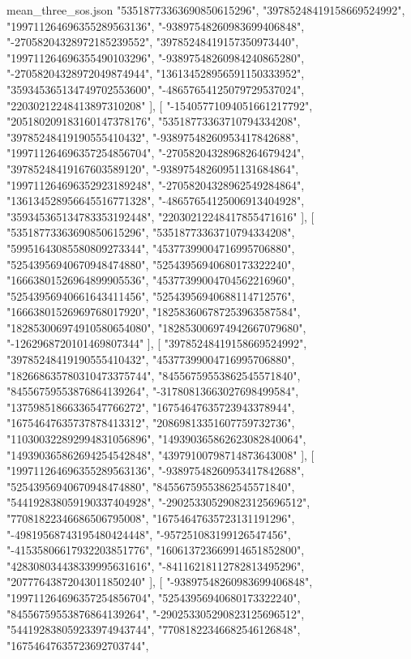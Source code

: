 \begin{filecontents*}[overwrite]{mean_three_sos.json}
    "53518773363690850615296",
    "39785248419158669524992",
    "199711264696355289563136",
    "-93897548260983699406848",
    "-27058204328972185239552",
    "39785248419157350973440",
    "199711264696355490103296",
    "-93897548260984240865280",
    "-27058204328972049874944",
    "136134528956591150333952",
    "359345365134749702553600",
    "-48657654125079729537024",
    "22030212248413897310208"
   ],
   [
    "-15405771094051661217792",
    "205180209183160147378176",
    "53518773363710794334208",
    "39785248419190555410432",
    "-93897548260953417842688",
    "199711264696357254856704",
    "-27058204328968264679424",
    "39785248419167603589120",
    "-93897548260951131684864",
    "199711264696352923189248",
    "-27058204328962549284864",
    "136134528956645516771328",
    "-48657654125006913404928",
    "359345365134783353192448",
    "22030212248417855471616"
   ],
   [
    "53518773363690850615296",
    "53518773363710794334208",
    "59951643085580809273344",
    "45377399004716995706880",
    "52543956940670948474880",
    "52543956940680173322240",
    "16663801526964899905536",
    "45377399004704562216960",
    "52543956940661643411456",
    "52543956940688114712576",
    "16663801526969768017920",
    "182583606787253963587584",
    "182853006974910580654080",
    "182853006974942667079680",
    "-1262968720101469807344"
   ],
   [
    "39785248419158669524992",
    "39785248419190555410432",
    "45377399004716995706880",
    "182668635780310473375744",
    "84556759553862545571840",
    "84556759553876864139264",
    "-31780813663027698499584",
    "13759851866336547766272",
    "16754647635723943378944",
    "16754647635737878413312",
    "20869813351607759732736",
    "110300322892994831056896",
    "149390365862623082840064",
    "149390365862694254542848",
    "43979100798714873643008"
   ],
   [
    "199711264696355289563136",
    "-93897548260953417842688",
    "52543956940670948474880",
    "84556759553862545571840",
    "544192838059190337404928",
    "-290253305290823125696512",
    "77081822346686506795008",
    "16754647635723131191296",
    "-49819568743195480424448",
    "-957251083199126547456",
    "-41535806617932203851776",
    "160613723669914651852800",
    "428308034438339995631616",
    "-84116218112782813495296",
    "20777643872043011850240"
   ],
   [
    "-93897548260983699406848",
    "199711264696357254856704",
    "52543956940680173322240",
    "84556759553876864139264",
    "-290253305290823125696512",
    "544192838059233974943744",
    "77081822346682546126848",
    "16754647635723692703744",

\end{filecontents*}
